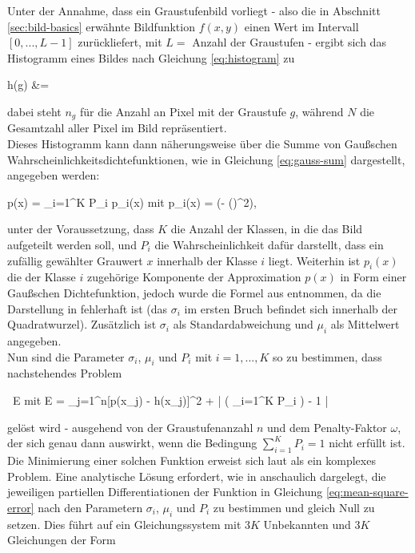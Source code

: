 		Unter der Annahme, dass ein Graustufenbild vorliegt - also die in Abschnitt \ref{sec:bild-basics} erwähnte Bildfunktion $f(x,y)$ einen Wert im Intervall $[0, ..., L-1]$ zurückliefert, mit $L = $ Anzahl der Graustufen - ergibt sich das Histogramm eines Bildes nach Gleichung \ref{eq:histogram} zu
		\begin{flalign}
			\centering
			h(g) &=  \label{eq:histogram}
		\end{flalign}
		dabei steht $n_{g}$ für die Anzahl an Pixel mit der Graustufe $g$, während $N$ die Gesamtzahl aller Pixel im Bild repräsentiert.\\
		Dieses Histogramm kann dann näherungsweise über die Summe von Gaußschen Wahrscheinlichkeitsdichtefunktionen, wie in Gleichung \ref{eq:gauss-sum} dargestellt, angegeben werden:
		\begin{flalign}
			\centering
			p(x) = \sum_{i=1}^{K} P_{i} \cdot p_{i}(x) \quad \textrm{mit} \quad p_{i}(x) =  \exp\left(- \cdot \left(\right)^{2}\right), \label{eq:gauss-sum}
		\end{flalign}
		unter der Voraussetzung, dass $K$ die Anzahl der Klassen, in die das Bild aufgeteilt werden soll, und $P_{i}$ die Wahrscheinlichkeit dafür darstellt, dass ein zufällig gewählter Grauwert $x$ innerhalb der Klasse $i$ liegt. Weiterhin ist $p_{i}(x)$ die der Klasse $i$ zugehörige Komponente der Approximation $p(x)$ in Form einer Gaußschen Dichtefunktion, jedoch wurde die Formel aus \cite{papula-gauss} entnommen, da die Darstellung in \cite{cuevas-meth1} fehlerhaft ist (das $\sigma_{i}$ im ersten Bruch befindet sich innerhalb der Quadratwurzel). Zusätzlich ist $\sigma_{i}$ als Standardabweichung und $\mu_{i}$ als Mittelwert angegeben.\\
		Nun sind die Parameter $\sigma_{i}$, $\mu_{i}$ und $P_{i}$ mit $i = 1, ..., K$ so zu bestimmen, dass nachstehendes Problem
		\begin{flalign}
			\centering
			 \ E \quad \textrm{mit } E =  \sum_{j=1}^{n}[p(x_{j}) - h(x_{j})]^{2} + \omega \cdot \left| \left( \sum_{i=1}^{K} P_{i} \right) - 1 \right| \label{eq:mean-square-error}
		\end{flalign}
		gelöst wird - ausgehend von der Graustufenanzahl $n$ und dem Penalty-Faktor $\omega$, der sich genau dann auswirkt, wenn die Bedingung $\sum_{i=1}^{K} P_{i} = 1$ nicht erfüllt ist.\\
		Die Minimierung einer solchen Funktion erweist sich laut \cite{cuevas-meth1} als ein komplexes Problem. Eine analytische Lösung erfordert, wie in \cite[S. 248-250]{papula-optimization} anschaulich dargelegt, die jeweiligen partiellen Differentiationen der Funktion in Gleichung \ref{eq:mean-square-error} nach den Parametern $\sigma_{i}$, $\mu_{i}$ und $P_{i}$ zu bestimmen und gleich Null zu setzen. Dies führt auf ein Gleichungssystem mit $3K$ Unbekannten und $3K$ Gleichungen der Form
